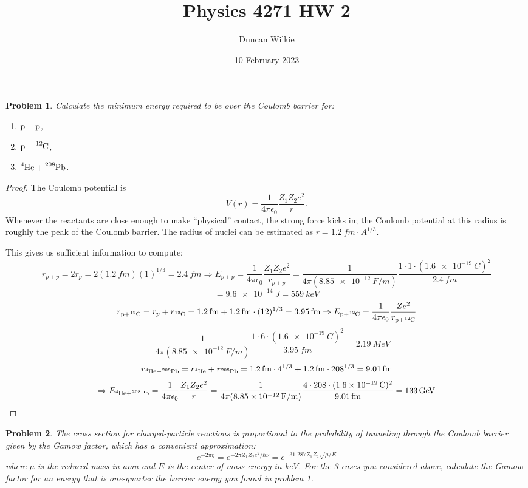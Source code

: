 \documentclass{article}
\title{Physics 4271 HW 2}
\author{Duncan Wilkie}
\date{10 February 2023}
\newtheorem{plm}{Problem}
\begin{document}
\maketitle

\begin{plm}
  Calculate the minimum energy required to be over the Coulomb barrier for:
  \begin{enumerate}
  \item $\ce{p + p}$,
  \item $\ce{p + ^{12}C}$,
  \item $\ce{^{4}He + ^{208}Pb}$.
  \end{enumerate}
\end{plm}

\begin{proof}
  The Coulomb potential is
  \[
    V(r) = \frac{1}{4\pi\epsilon_{0}}\frac{Z_{1}Z_{2}e^{2}}{r}.
  \]
  Whenever the reactants are close enough to make ``physical'' contact, the strong force kicks in;
  the Coulomb potential at this radius is roughly the peak of the Coulomb barrier.
  The radius of nuclei can be estimated as $r = \SI{1.2}{fm} \cdot A^{1/3}$.

  This gives us sufficient information to compute:
  \[
    r_{p + p} = 2r_{p} = 2(\SI{1.2}{fm})(1)^{1/3} = \SI{2.4}{fm}
    \Rightarrow E_{p + p} = \frac{1}{4\pi\epsilon_{0}}\frac{Z_{1}Z_{2}e^{2}}{r_{p + p}}
    = \frac{1}{4\pi(\SI{8.85e-12}{F/m})}\frac{1 \cdot 1 \cdot (\SI{1.6e-19}{C})^{2}}{\SI{2.4}{fm}}
  \]
  \[
    = \SI{9.6e-14}{J} = \SI{559}{keV}
  \]
  \[
    r_{\ce{p + {}^{12}C}} = r_{p} + r_{\ce{^{12}C}} = \SI{1.2}{fm} + \SI{1.2}{fm} \cdot (12)^{1/3} = \SI{3.95}{fm}
    \Rightarrow E_{\ce{p + ^{12}C}} = \frac{1}{4\pi\epsilon_{0}}\frac{Ze^{2}}{r_{\ce{p + ^{12}C}}}
  \]
  \[
    = \frac{1}{4\pi(\SI{8.85e-12}{F/m})}\frac{1 \cdot 6 \cdot (\SI{1.6e-19}{C})^{2}}{\SI{3.95}{fm}}
    = \SI{2.19}{MeV}
  \]
  \[
    r_{\ce{^{4}He + ^{208}Pb}} = r_{\ce{^{4}He}} + r_{\ce{^{208}Pb}} = \SI{1.2}{fm} \cdot 4^{1/3} + \SI{1.2}{fm} \cdot 208^{1/3}
    = \SI{9.01}{fm}
  \]
  \[
    \Rightarrow E_{\ce{^{4}He + ^{208}Pb}} = \frac{1}{4\pi\epsilon_{0}}\frac{Z_{1}Z_{2}e^{2}}{r}
    = \frac{1}{4\pi(\SI{8.85e-12}{F/m})}\frac{4 \cdot 208 \cdot (\SI{1.6e-19}{C})^{2}}{\SI{9.01}{fm}}
    = \SI{133}{GeV}
  \]
\end{proof}

\begin{plm}
  The cross section for charged-particle reactions is proportional to the probability of tunneling through the Coulomb barrier
  given by the Gamow factor, which has a convenient approximation:
  \[
    e^{-2\pi\eta} = e^{-2\pi Z_{1}Z_{2}e^{2}/\hbar\nu} = e^{-31.287Z_{1}Z_{2}\sqrt{\mu/E}}
  \]
  where $\mu$ is the reduced mass in \si{amu} and $E$ is the center-of-mass energy in \si{keV}.
  For the 3 cases you considered above, calculate the Gamow factor for an energy that is one-quarter the barrier energy you found in problem 1.
\end{plm}
\end{document}
